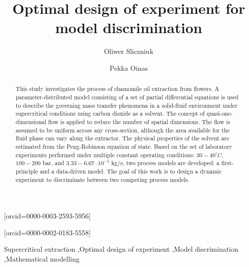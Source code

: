 \documentclass[a4paper,fleqn]{cas-dc}
\begin{document}
 

\title[mode=title]{Optimal design of experiment for model discrimination}                      


\author[1]{Oliwer Sliczniuk}[orcid=0000-0003-2593-5956]
\cormark[1]

\author[1]{Pekka Oinas}[orcid=0000-0002-0183-5558]


\address[1]{Aalto University, School of Chemical Engineering, Espoo, 02150, Finland}


\begin{abstract}
This study investigates the process of chamomile oil extraction from flowers. A parameter-distributed model consisting of a set of partial differential equations is used to describe the governing mass transfer phenomena in a solid-fluid environment under supercritical conditions using carbon dioxide as a solvent. The concept of quasi-one-dimensional flow is applied to reduce the number of spatial dimensions. The flow is assumed to be uniform across any cross-section, although the area available for the fluid phase can vary along the extractor. The physical properties of the solvent are estimated from the Peng-Robinson equation of state. Based on the set of laboratory experiments performed under multiple constant operating conditions: $30 - 40^\circ C$, $100 - 200$ bar, and $3.33-6.67 \cdot 10^{-5}$ kg/s, two process models are developed: a first-principle and a data-driven model. The goal of this work is to design a dynamic experiment to discriminate between two competing process models.

\end{abstract}

\begin{keywords}
Supercritical extraction \sep Optimal design of experiment \sep Model discrimination \sep Mathematical modelling
\end{keywords}
\end{document}
